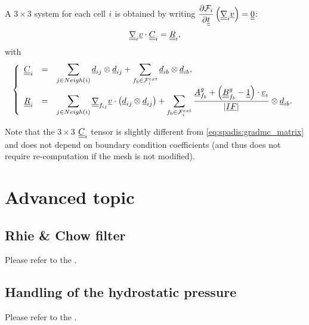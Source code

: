 A $3\times 3$ system for each cell $i$
is obtained by writing  $\dfrac{\partial \mathcal{F}_i}{\partial \underline{\underline{t}} }
\left( \underline{\underline{\nabla}}_i \underline{v} \right)= \underline{\underline{0}}$:
%
\begin{equation}\label{eq:spadis:gradmv_matrix}
\underline{\underline{\nabla}}_i \underline{v} \cdot \underline{\underline{C}}_i = \underline{\underline{R}}_i ,
\end{equation}
with
%
\begin{equation}
\left\{
\begin{array}{r c l}
\underline{\underline{C}}_i &=&
\displaystyle
 \sum\limits_{j \in Neigh\left(i\right) }
 \underline{d}_{ij} \otimes \underline{d}_{ij}
+
\sum\limits_{{f_{b}} \in \mathcal{F}^{ext}_{i}}
\underline{d}_{ib} \otimes  \underline{d}_{ib} ,
\\
\underline{\underline{R}}_i &=&
\displaystyle
\sum\limits_{ j \in Neigh\left(i\right) }
 \underline{\underline{\nabla}}_{{f_{ij}}} \underline{v}   \cdot \left( \underline{d}_{ij} \otimes \underline{d}_{ij} \right)
+
\sum\limits_{ {f_{b}} \in \mathcal{F}^{ext}_{i}}
\dfrac{
\underline{A}^g_{f_{b}} +\left(\underline{\underline{B}}^g_{f_{b}} -\underline{\underline{1}} \right) \cdot \underline{v}_i
}{
\left| \underline{I F} \right|
}
\otimes
\underline{d}_{ib} .
\end{array}\right.
\end{equation}
%

\begin{remark}
Note that the $3\times3$ $\underline{\underline{C}}_i$ tensor is  slightly different from \eqref{eq:spadis:gradmc_matrix} and does not depend
 on boundary condition coefficients (and thus does not require re-computation if the mesh is not modified).
\end{remark}

\section{Advanced topic}

\subsection{Rhie \& Chow filter}

\hypertarget{arak}{}

Please refer to the .

\subsection{Handling of the hydrostatic pressure}

\hypertarget{iphydr}{}

Please refer to the .
